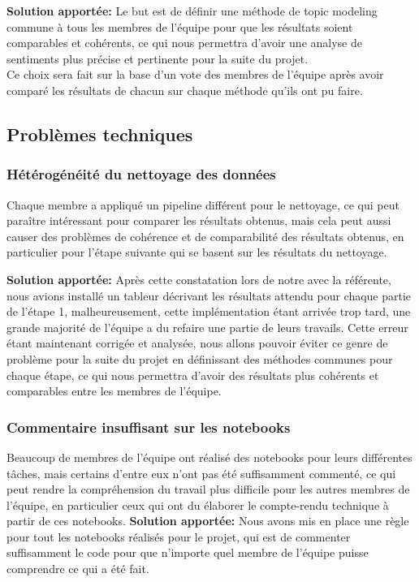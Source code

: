 \documentclass[12pt,a4paper]{article}
\begin{document}
\hspace{0.5cm}\textbf{Solution apportée:} Le but est de définir une méthode de topic modeling commune à tous les membres 
de l'équipe pour que les résultats soient comparables et cohérents, ce qui nous permettra d'avoir une analyse 
de sentiments plus précise et pertinente pour la suite du projet.\\
Ce choix sera fait sur la base d'un vote des membres de l'équipe après avoir comparé les résultats de chacun sur chaque méthode qu'ils ont pu faire.

\pagebreak
\subsection{Problèmes techniques}
\subsubsection{Hétérogénéité du nettoyage des données}
Chaque membre a appliqué un pipeline différent pour le nettoyage, ce qui peut paraître intéressant
pour comparer les résultats obtenus, mais cela peut aussi causer des problèmes de cohérence et de comparabilité
des résultats obtenus, en particulier pour l'étape suivante qui se basent sur les résultats du nettoyage. \smallbreak

\hspace{0.5cm}\textbf{Solution apportée:} Après cette constatation lors de notre 
 avec la référente, nous avions installé un tableur décrivant les 
résultats attendu pour chaque partie de l'étape 1, malheureusement, cette implémentation étant 
arrivée trop tard, une grande majorité de l'équipe a du refaire une partie de leurs travails.
Cette erreur étant maintenant corrigée et analysée, nous allons pouvoir éviter ce genre de problème
pour la suite du projet en définissant des méthodes communes pour chaque étape,
ce qui nous permettra d'avoir des résultats plus cohérents et comparables entre les membres de l'équipe.
\subsubsection{Commentaire insuffisant sur les notebooks}
Beaucoup de membres de l'équipe ont réalisé des notebooks pour leurs différentes tâches, mais certains d'entre eux
n'ont pas été suffisamment commenté, ce qui peut rendre la compréhension du travail plus difficile
pour les autres membres de l'équipe, en particulier ceux qui ont du élaborer le compte-rendu technique à partir de ces notebooks. \smallbreak
\hspace{0.5cm}\textbf{Solution apportée:} Nous avons mis en place une règle pour tout les notebooks réalisés pour le projet, 
qui est de commenter suffisamment le code pour que n'importe quel membre de l'équipe puisse comprendre ce qui a été fait.
\end{document}
